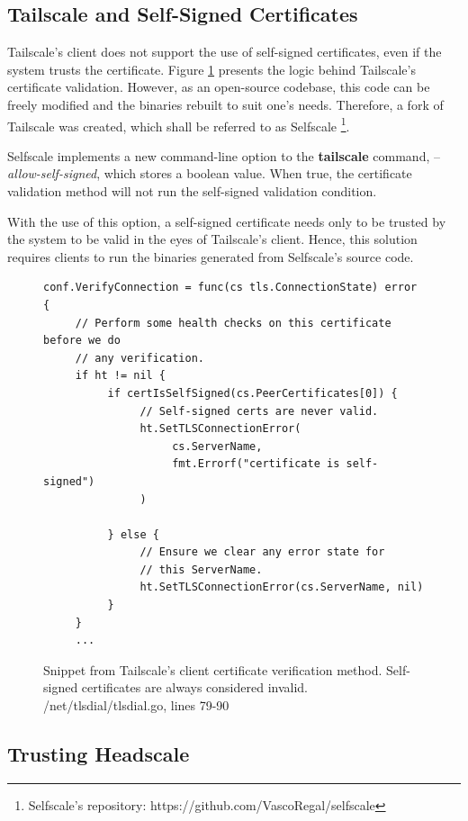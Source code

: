 \documentclass[11pt,twoside,a4paper]{report}
\begin{document}
\subsection{Tailscale and Self-Signed Certificates}
\label{sec:selfscale}

Tailscale's client does not support the use of self-signed certificates, even if the system trusts the certificate. Figure \ref{fig:tscert} presents the logic behind Tailscale's certificate validation. However, as an open-source codebase, this code can be freely modified and the binaries rebuilt to suit one's needs. Therefore, a fork of Tailscale was created, which shall be referred to as Selfscale \footnote{Selfscale's repository: https://github.com/VascoRegal/selfscale}.

Selfscale implements a new command-line option to the \textbf{tailscale} command, --\emph{allow-self-signed}, which stores a boolean value. When true, the certificate validation method will not run the self-signed validation condition.

With the use of this option, a self-signed certificate needs only to be trusted by the system to be valid in the eyes of Tailscale's client. Hence, this solution requires clients to run the binaries generated from Selfscale's source code.

\begin{figure}
\centering
\begin{lstlisting}
conf.VerifyConnection = func(cs tls.ConnectionState) error {
     // Perform some health checks on this certificate before we do
     // any verification.
     if ht != nil {
          if certIsSelfSigned(cs.PeerCertificates[0]) {
               // Self-signed certs are never valid.
               ht.SetTLSConnectionError(
                    cs.ServerName,
                    fmt.Errorf("certificate is self-signed")
               )

          } else {
               // Ensure we clear any error state for
               // this ServerName.
               ht.SetTLSConnectionError(cs.ServerName, nil)
          }
     }
     ...
\end{lstlisting}
\label{fig:tscert}
\caption{Snippet from Tailscale's client certificate verification method. Self-signed certificates are always considered invalid. /net/tlsdial/tlsdial.go, lines 79-90 }
\end{figure}

\subsection{Trusting Headscale}
\end{document}
